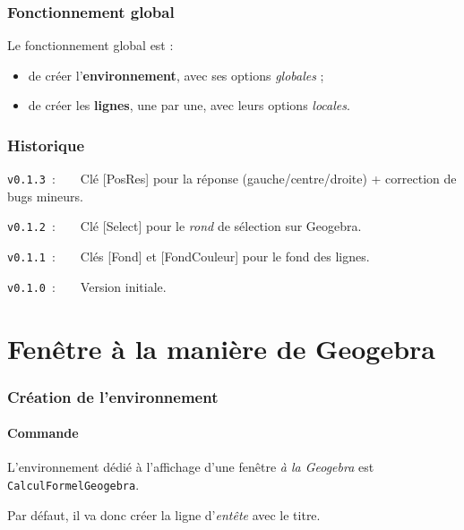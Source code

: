 \documentclass[french,a4paper,11pt]{article}
\begin{document}
\section{Fonctionnement global}

\begin{importantblock}
Le fonctionnement global est :

\begin{itemize}
	\item de créer l'\textbf{environnement}, avec ses options \textit{globales} ;
	\item de créer les \textbf{lignes}, une par une, avec leurs options \textit{locales}.
\end{itemize}
\vspace*{-\baselineskip}\leavevmode
\end{importantblock}

\vfill

\section{Historique}


\verb|v0.1.3|~:~~~~Clé \textsf{[PosRes]} pour la réponse (gauche/centre/droite) + correction de bugs mineurs.

\verb|v0.1.2|~:~~~~Clé \textsf{[Select]} pour le \textit{rond} de sélection sur Geogebra.

\verb|v0.1.1|~:~~~~Clés \textsf{[Fond]} et \textsf{[FondCouleur]} pour le fond des lignes.

\verb|v0.1.0|~:~~~~Version initiale.

\hspace*{1cm}

\pagebreak

\part{Fenêtre à la manière de Geogebra}

\section{Création de l'environnement}

\subsection{Commande}

\begin{cautionblock}
L'environnement dédié à l'affichage d'une fenêtre \textit{à la Geogebra} est \texttt{CalculFormelGeogebra}.

Par défaut, il va donc créer la ligne d'\textit{entête} avec le titre.
\end{cautionblock}
\end{document}
